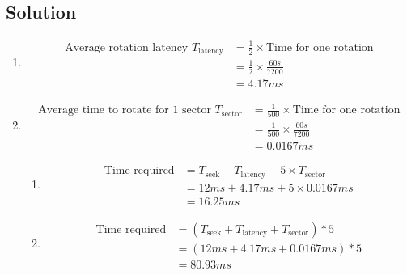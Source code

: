 \documentclass{article}
\begin{document}
\subsection*{Solution}

\begin{enumerate}[label=(\alph*)]
    \item \begin{align*}
              \text{Average rotation latency } T_\text{latency} & = \frac{1}{2} \times \text{Time for one rotation} \\
                                                                & = \frac{1}{2} \times \frac{60s}{7200}             \\
                                                                & = 4.17ms
          \end{align*}
    \item \begin{align*}
              \text{Average time to rotate for 1 sector } T_\text{sector} & = \frac{1}{500} \times \text{Time for one rotation} \\
                                                                          & = \frac{1}{500} \times \frac{60s}{7200}             \\
                                                                          & = 0.0167ms
          \end{align*}
          \begin{enumerate}[label=(\roman*)]
              \item \begin{align*}
                        \text{Time required} & = T_\text{seek} + T_\text{latency} + 5 \times T_\text{sector} \\
                                             & = 12ms + 4.17ms + 5 \times 0.0167ms                           \\
                                             & = 16.25ms
                    \end{align*}
              \item \begin{align*}
                        \text{Time required} & = (T_\text{seek} + T_\text{latency} + T_\text{sector}) * 5 \\
                                             & = (12ms + 4.17ms + 0.0167ms) * 5                           \\
                                             & = 80.93ms
                    \end{align*}
          \end{enumerate}
\end{enumerate}
\end{document}
